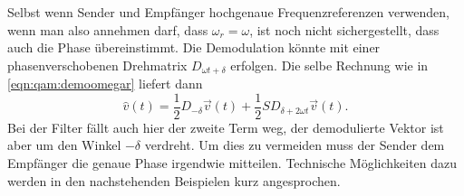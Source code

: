 Selbst wenn Sender und Empfänger hochgenaue Frequenzreferenzen verwenden,
wenn man also annehmen darf, dass $\omega_r=\omega$,
ist noch nicht sichergestellt, dass auch die Phase übereinstimmt.
Die Demodulation könnte mit einer phasenverschobenen Drehmatrix
$D_{\omega t+\delta}$ erfolgen.
Die selbe Rechnung wie in \eqref{eqn:qam:demoomegar} liefert dann
\[
\hat{v}(t)
=
\frac12D_{-\delta}\vec{v}(t)
+
\frac12SD_{\delta+2\omega t}\vec{v}(t).
\]
Bei der Filter fällt auch hier der zweite Term weg, der demodulierte
Vektor ist aber um den Winkel $-\delta$ verdreht.
Um dies zu vermeiden muss der Sender dem Empfänger die genaue Phase
irgendwie mitteilen.
Technische Möglichkeiten dazu werden in den nachstehenden Beispielen
kurz angesprochen.







